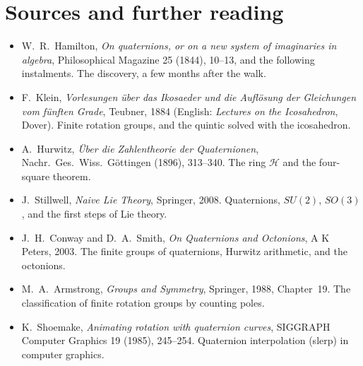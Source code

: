 \section*{Sources and further reading}

\begin{itemize}
\item W.~R.~Hamilton, \emph{On quaternions, or on a new system of imaginaries in algebra}, Philosophical Magazine 25 (1844), 10--13, and the following instalments. The discovery, a few months after the walk.
\item F.~Klein, \emph{Vorlesungen über das Ikosaeder und die Auflösung der Gleichungen vom fünften Grade}, Teubner, 1884 (English: \emph{Lectures on the Icosahedron}, Dover). Finite rotation groups, and the quintic solved with the icosahedron.
\item A.~Hurwitz, \emph{Über die Zahlentheorie der Quaternionen}, Nachr.\ Ges.\ Wiss.\ Göttingen (1896), 313--340. The ring $\mathcal H$ and the four-square theorem.
\item J.~Stillwell, \emph{Naive Lie Theory}, Springer, 2008. Quaternions, $SU(2)$, $SO(3)$, and the first steps of Lie theory.
\item J.~H.~Conway and D.~A.~Smith, \emph{On Quaternions and Octonions}, A K Peters, 2003. The finite groups of quaternions, Hurwitz arithmetic, and the octonions.
\item M.~A.~Armstrong, \emph{Groups and Symmetry}, Springer, 1988, Chapter~19. The classification of finite rotation groups by counting poles.
\item K.~Shoemake, \emph{Animating rotation with quaternion curves}, SIGGRAPH Computer Graphics 19 (1985), 245--254. Quaternion interpolation (slerp) in computer graphics.
\end{itemize}
